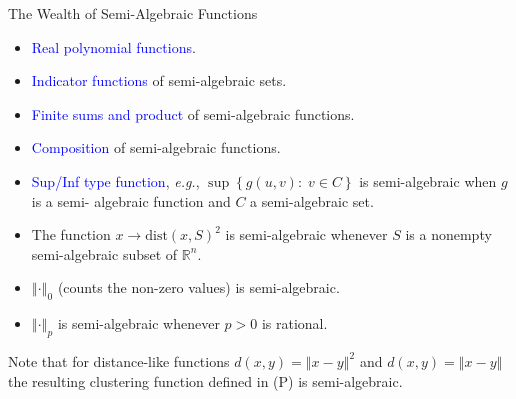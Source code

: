 \documentclass[9pt,handout]{beamer} %
\newcommand{\gap}{\vspace{0.1in}}
\newcommand{\eg}{{\em e.g.}, }
\newcommand{\rr}{\mathbb{R}} %
\newcommand{\norm}[1]{\left\Vert {#1} \right\Vert} %
\newcommand{\dist}{\mathrm{dist}} %
\begin{document}
    \begin{frame}{The Wealth of Semi-Algebraic Functions}
        \begin{itemize}
        	\item \textcolor{blue}{Real polynomial functions}.
            \item \textcolor{blue}{Indicator functions} of semi-algebraic sets.
            \item \textcolor{blue}{Finite sums and product} of semi-algebraic functions. 
            \item \textcolor{blue}{Composition} of semi-algebraic functions.
            \item \textcolor{blue}{Sup/Inf type function}, \eg $\sup \left\{ g\left(u , 
            	v\right) : \; v \in C \right\}$ is semi-algebraic when $g$ is a semi-
            	algebraic function and $C$ a semi-algebraic set.
             \item The function $x \to \dist\left(x , S\right)^{2}$ is semi-algebraic 
             	whenever $S$ is a nonempty semi-algebraic subset of $\rr^{n}$.
             \item $\norm{\cdot}_{0}$ (counts the non-zero values) is semi-algebraic.
             \item $\norm{\cdot}_{p}$ is semi-algebraic whenever $p > 0$ is rational.
        \end{itemize}
        \gap

 		Note that for distance-like functions $d(x,y)=\norm{x-y}^2$ and $d(x,y)=\norm{x-y}$ the resulting clustering function defined in (P) is semi-algebraic.
    \end{frame}
\end{document}
